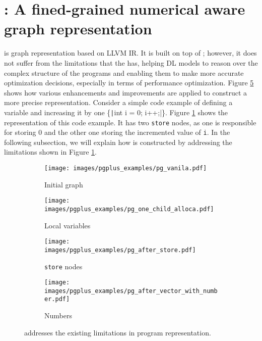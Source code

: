 \section{\ourtool: A fined-grained numerical aware graph representation}
\label{sec:approach}
\vspace{-4pt}
\ourtool is graph representation based on LLVM IR. It is built on top of \programl; however, it does not suffer from the limitations that the \programl has, helping DL models to reason over the complex structure of the programs and enabling them to make more accurate optimization decisions, especially in terms of performance optimization.
Figure \ref{fig:overview_of_perfograph} shows how various enhancements and improvements are applied to construct a more precise representation. 
Consider a simple code example of defining a variable and increasing it by one \{\texttt|int i = 0; i++;|\}. Figure \ref{fig:programl_variable_definition} shows the \programl representation of this code example. It has two \texttt{store} nodes, as one is responsible for storing 0 and the other one storing the incremented value of \texttt{i}.
In the following subsection, we will explain how \ourtool is constructed by addressing the limitations shown in Figure \ref{fig:programl_variable_definition}.

\begin{figure}[H]
\vspace{-10pt}
     \begin{subfigure}[t]{0.22\textwidth}
         \texttt{[image: images/pgplus\_examples/pg\_vanila.pdf]}
         \caption{Initial graph}
         \label{fig:programl_variable_definition}
     \end{subfigure}
     \hfill
     \begin{subfigure}[t]{0.18\textwidth}
         \centering
         \texttt{[image: images/pgplus\_examples/pg\_one\_child\_alloca.pdf]}
         \caption{Local variables}
         \label{fig:presenting_local_variables}
     \end{subfigure}
     \hfill
     \begin{subfigure}[t]{0.17\textwidth}
         \centering
         \texttt{[image: images/pgplus\_examples/pg\_after\_store.pdf]}
         \caption{\texttt{store} nodes}
         \label{fig:store_nodes}
     \end{subfigure}
     \hfill
     \begin{subfigure}[t]{0.18\textwidth}
         \centering
         \texttt{[image: images/pgplus\_examples/pg\_after\_vector\_with\_number.pdf]}
         \caption{Numbers}
         \label{fig:numerical_values}
     \end{subfigure}
        \caption{\ourtool addresses the existing limitations in program representation.}
        \label{fig:overview_of_perfograph}
    \vspace{-15pt}
    \end{figure}

